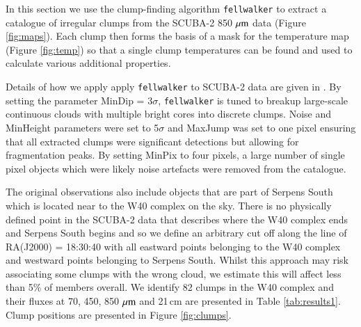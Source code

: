 In this section we use the clump-finding algorithm \texttt{fellwalker} \citep{Berry:2014vn} to extract a catalogue 
of irregular clumps from the SCUBA-2 850\,$\,\mu\rm{m}$ data (Figure \ref{fig:maps}). Each clump then forms the 
basis of a mask for the temperature map (Figure \ref{fig:temp}) so that a single clump temperatures can be 
found and used to calculate various additional properties. 

Details of how we apply apply \texttt{fellwalker} to SCUBA-2 data are given in \cite{Rumble:2015vn}. By 
setting the parameter MinDip = 3$\sigma$, \texttt{fellwalker} is tuned to breakup large-scale continuous 
clouds with multiple bright cores into discrete clumps. Noise and MinHeight parameters were set to 5$\sigma$ 
and MaxJump was set to one pixel ensuring that all extracted clumps were significant detections but allowing 
for fragmentation peaks. By setting MinPix to four pixels, a large number of single pixel objects which were likely 
noise artefacts were removed from the catalogue.   

The original observations also include objects that are part of Serpens South which is located near to the W40 
complex on the sky. There is no physically defined point in the SCUBA-2 data that describes where the W40 complex ends 
and Serpens South begins and so we define an arbitrary cut off along the line of RA(J2000) = 18:30:40 with all 
eastward points belonging to the W40 complex and westward points belonging to Serpens South. Whilst this 
approach may risk associating some clumps with the wrong cloud, we estimate this will affect less than 5\% of 
members overall. We identify 82 clumps in the W40 complex and their fluxes at 70, 450, 850\,$\,\mu\rm{m}$ and 
21\,cm are presented in Table \ref{tab:results1}. Clump positions are presented in Figure \ref{fig:clumps}.

